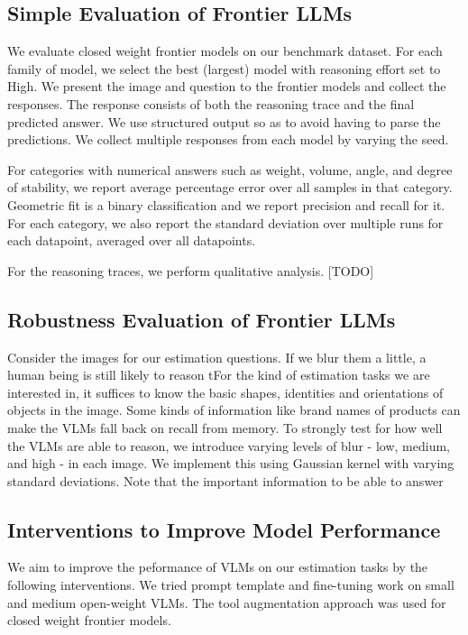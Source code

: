 \subsection{Simple Evaluation of Frontier LLMs}
  We evaluate closed weight frontier models on our benchmark dataset. For each family of model, we select the best (largest) model with reasoning effort set to High. We present the image and question to the frontier models and collect the responses. The response consists of both the reasoning trace and the final predicted answer. We use structured output so as to avoid having to parse the predictions. We collect multiple responses from each model by varying the seed. 

For categories with numerical answers such as weight, volume, angle, and degree of stability, we report average percentage error over all samples in that category. Geometric fit is a binary classification and we report precision and recall for it. For each category, we also report the standard deviation over multiple runs for each datapoint, averaged over all datapoints.

For the reasoning traces, we perform qualitative analysis. [TODO]

\subsection{Robustness Evaluation of Frontier LLMs}
  Consider the images for our estimation questions. If we blur them a little, a human being is still likely to reason tFor the kind of estimation tasks we are interested in, it suffices to know the basic shapes, identities and orientations of objects in the image. Some kinds of information like brand names of products can make the VLMs fall back on recall from memory. To strongly test for how well the VLMs are able to reason, we introduce varying levels of blur - low, medium, and high - in each image. We implement this using Gaussian kernel with varying standard deviations. Note that the important information to be able to answer 


\subsection{Interventions to Improve Model Performance}

We aim to improve the peformance of VLMs on our estimation tasks by the following interventions. We tried prompt template and fine-tuning work on small and medium open-weight VLMs. The tool augmentation approach was used for closed weight frontier models.

